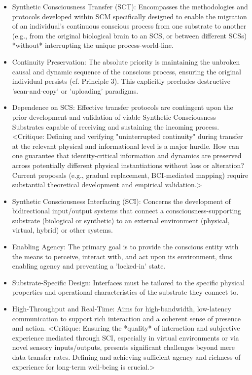 \documentclass[10pt]{article}
\begin{document}
\begin{sloppypar}
\begin{itemize}
    \item Synthetic Consciousness Transfer (SCT): Encompasses the methodologies and protocols developed within SCM specifically designed to enable the migration of an individual's continuous conscious process from one substrate to another (e.g., from the original biological brain to an SCS, or between different SCSs) *without* interrupting the unique process-world-line.
    \item Continuity Preservation: The absolute priority is maintaining the unbroken causal and dynamic sequence of the conscious process, ensuring the original individual persists (cf. Principle 3). This explicitly precludes destructive 'scan-and-copy' or 'uploading' paradigms.
    \item Dependence on SCS: Effective transfer protocols are contingent upon the prior development and validation of viable Synthetic Consciousness Substrates capable of receiving and sustaining the incoming process. <Critique: Defining and verifying "uninterrupted continuity" during transfer at the relevant physical and informational level is a major hurdle. How can one guarantee that identity-critical information and dynamics are preserved across potentially different physical instantiations without loss or alteration? Current proposals (e.g., gradual replacement, BCI-mediated mapping) require substantial theoretical development and empirical validation.>
    \item Synthetic Consciousness Interfacing (SCI): Concerns the development of bidirectional input/output systems that connect a consciousness-supporting substrate (biological or synthetic) to an external environment (physical, virtual, hybrid) or other systems.
    \item Enabling Agency: The primary goal is to provide the conscious entity with the means to perceive, interact with, and act upon its environment, thus enabling agency and preventing a 'locked-in' state.
    \item Substrate-Specific Design: Interfaces must be tailored to the specific physical properties and operational characteristics of the substrate they connect to.
    \item High-Throughput and Real-Time: Aims for high-bandwidth, low-latency communication to support rich interaction and a coherent sense of presence and action. <Critique: Ensuring the *quality* of interaction and subjective experience mediated through SCI, especially in virtual environments or via novel sensory inputs/outputs, presents significant challenges beyond mere data transfer rates. Defining and achieving sufficient agency and richness of experience for long-term well-being is crucial.>

\end{itemize}
\end{sloppypar}
\end{document}
